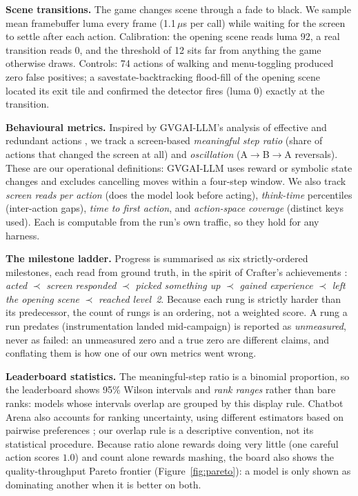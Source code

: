 \documentclass{article} %
\begin{document}
\textbf{Scene transitions.} The game changes scene through a fade to black.
We sample mean framebuffer luma every frame (1.1\,$\mu$s per call) while
waiting for the screen to settle after each action. Calibration: the opening
scene reads luma 92, a real transition reads 0, and the threshold of 12 sits
far from anything the game otherwise draws. Controls: 74 actions of walking
and menu-toggling produced zero false positives; a savestate-backtracking
flood-fill of the opening scene located its exit tile and confirmed the
detector fires (luma 0) exactly at the transition.

\textbf{Behavioural metrics.} Inspired by GVGAI-LLM's analysis of effective
and redundant actions \citep{li2025gvgai}, we track a screen-based
\emph{meaningful step ratio} (share of actions that changed the screen at
all) and \emph{oscillation} (A$\to$B$\to$A reversals).
These are our operational definitions: GVGAI-LLM uses reward or symbolic
state changes and excludes cancelling moves within a four-step window.
We also track \emph{screen reads per
action} (does the model look before acting), \emph{think-time} percentiles
(inter-action gaps), \emph{time to first action}, and \emph{action-space
coverage} (distinct keys used). Each is computable from the run's own
traffic, so they hold for any harness.

\textbf{The milestone ladder.} Progress is summarised as six strictly-ordered
milestones, each read from ground truth, in the spirit of Crafter's
achievements \citep{hafner2021benchmarking}: \emph{acted} $\prec$ \emph{screen
responded} $\prec$ \emph{picked something up} $\prec$ \emph{gained
experience} $\prec$ \emph{left the opening scene} $\prec$ \emph{reached
level~2}. Because each rung is strictly harder than its predecessor, the
count of rungs is an ordering, not a weighted score. A rung a run predates
(instrumentation landed mid-campaign) is reported as \emph{unmeasured},
never as failed: an unmeasured zero and a true zero are different claims,
and conflating them is how one of our own metrics went wrong.

\textbf{Leaderboard statistics.} The meaningful-step ratio is a binomial
proportion, so the leaderboard shows 95\% Wilson intervals
\citep{wilson1927probable} and \emph{rank ranges} rather than bare ranks:
models whose intervals overlap are grouped by this display rule.
Chatbot Arena also accounts for ranking uncertainty, using different
estimators based on pairwise preferences \citep{chiang2024chatbot}; our
overlap rule is a descriptive convention, not its statistical procedure.
Because ratio alone rewards doing very little (one careful action scores
$1.0$) and count alone rewards mashing, the board also shows the
quality-throughput Pareto frontier (Figure~\ref{fig:pareto}): a model is
only shown as dominating another when it is better on both.
\end{document}
